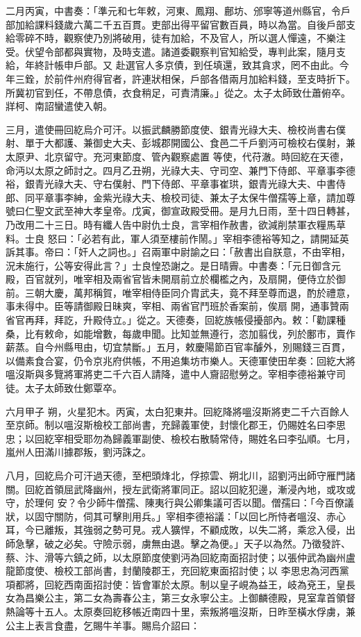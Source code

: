 \begin{pinyinscope}
 二月丙寅，中書奏：「準元和七年敕，河東、鳳翔、鄜坊、邠寧等道州縣官，令戶部加給課料錢歲六萬二千五百貫。吏部出得平留官數百員，時以為當。自後戶部支給零碎不時，觀察使乃別將破用，徒有加給，不及官人，所以選人憚遠，不樂注受。伏望令部都與實物，及時支遣。諸道委觀察判官知給受，專判此案，隨月支給，年終計帳申戶部。又
 赴選官人多京債，到任填還，致其貪求，罔不由此。今年三銓，於前件州府得官者，許連狀相保，戶部各借兩月加給料錢，至支時折下。所冀初官到任，不帶息債，衣食稍足，可責清廉。」從之。太子太師致仕蕭俯卒。牂柯、南詔蠻遣使入朝。



 三月，遣使冊回紇烏介可汗。以振武麟勝節度使、銀青光祿大夫、檢校尚書右僕射、單于大都護、兼御史大夫、彭城郡開國公、食邑二千戶劉沔可檢校右僕射，兼太原尹、北京留守。充河東節度、管內觀察處置
 等使，代苻澈。時回紇在天德，命沔以太原之師討之。四月乙丑朔，光祿大夫、守司空、兼門下侍郎、平章事李德裕，銀青光祿大夫、守右僕射、門下侍郎、平章事崔珙，銀青光祿大夫、中書侍郎、同平章事李紳，金紫光祿大夫、檢校司徒、兼太子太保牛僧孺等上章，請加尊號曰仁聖文武至神大孝皇帝。戊寅，御宣政殿受冊。是月九日雨，至十四日轉甚，乃改用二十三日。時有纖人告中尉仇士良，言宰相作赦書，欲減削禁軍衣糧馬草料。士良
 怒曰：「必若有此，軍人須至樓前作鬧。」宰相李德裕等知之，請開延英訴其事。帝曰：「奸人之詞也。」召兩軍中尉諭之曰：「赦書出自朕意，不由宰相，況未施行，公等安得此言？」士良惶恐謝之。是日晴霽。中書奏：「元日御含元殿，百官就列，唯宰相及兩省官皆未開扇前立於欄檻之內，及扇開，便侍立於御前。三朝大慶，萬邦稱賀，唯宰相侍臣同介胄武夫，竟不拜至尊而退，酌於禮意，事未得中。臣等請御殿日昧爽，宰相、兩省官鬥班於香案前，俟扇
 開，通事贊兩省官再拜，拜訖，升殿侍立。」從之。天德奏，回紇族帳侵擾部內。敕：「勸課種桑，比有敕命，如能增數，每歲申聞。比知並無遵行，恣加翦伐，列於鄽市，賣作薪蒸。自今州縣甩由，切宜禁斷。」五月，敕慶陽節百官率醵外，別賜錢三百貫，以備素食合宴，仍令京兆府供帳，不用追集坊市樂人。天德軍使田牟奏：回紇大將嗢沒斯與多覽將軍將吏二千六百人請降，遣中人齎詔慰勞之。宰相李德裕兼守司徒。太子太師致仕鄭覃卒。



 六月甲子
 朔，火星犯木。丙寅，太白犯東井。回紇降將嗢沒斯將吏二千六百餘人至京師。制以嗢沒斯檢校工部尚書，充歸義軍使，封懷化郡王，仍賜姓名曰李思忠；以回紇宰相受耶勿為歸義軍副使、檢校右散騎常侍，賜姓名曰李弘順。七月，嵐州人田滿川據郡叛，劉沔誅之。



 八月，回紇烏介可汗過天德，至杷頭烽北，俘掠雲、朔北川，詔劉沔出師守雁門諸關。回紇首領屈武降幽州，授左武衛將軍同正。詔以回紇犯邊，漸浸內地，或攻或守，於理何
 安？令少師牛僧孺、陳夷行與公卿集議可否以聞。僧孺曰：「今百僚議狀，以固守關防，伺其可擊則用兵。」宰相李德裕議：「以回匕所恃者嗢沒、赤心耳，今已離叛，其強弱之勢可見。戎人獷悍，不顧成敗，以失二將，乘忿入侵，出師急擊，破之必矣。守險示弱，虜無由退。擊之為便。」天子以為然。乃徵發許、蔡、汴、滑等六鎮之師，以太原節度使劉沔為回紇南面招討使；以張仲武為幽州盧龍節度使、檢校工部尚書，封蘭陵郡王，充回紇東面招討使；以
 李思忠為河西黨項都將，回紇西南面招討使：皆會軍於太原。制以皇子峴為益王，岐為兗王，皇長女為昌樂公主，第二女為壽春公主，第三女永寧公主。上御麟德殿，見室韋首領督熱論等十五人。太原奏回紇移帳近南四十里，索叛將嗢沒斯，日昨至橫水俘虜，兼公主上表言食盡，乞賜牛羊事。賜烏介詔曰：




\end{pinyinscope}
